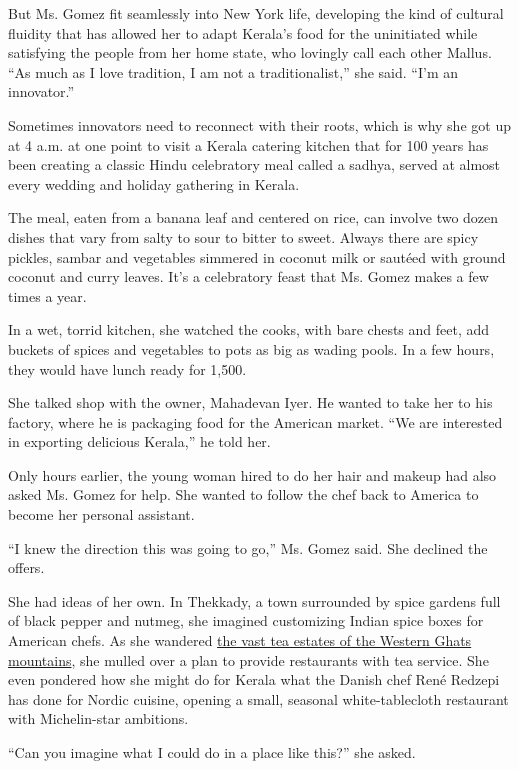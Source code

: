 But Ms. Gomez fit seamlessly into New York life, developing the kind of
cultural fluidity that has allowed her to adapt Kerala's food for the
uninitiated while satisfying the people from her home state, who
lovingly call each other Mallus. ``As much as I love tradition, I am not
a traditionalist,'' she said. ``I'm an innovator.''

Sometimes innovators need to reconnect with their roots, which is why
she got up at 4 a.m. at one point to visit a Kerala catering kitchen
that for 100 years has been creating a classic Hindu celebratory meal
called a sadhya, served at almost every wedding and holiday gathering in
Kerala.

The meal, eaten from a banana leaf and centered on rice, can involve two
dozen dishes that vary from salty to sour to bitter to sweet. Always
there are spicy pickles, sambar and vegetables simmered in coconut milk
or sautéed with ground coconut and curry leaves. It's a celebratory
feast that Ms. Gomez makes a few times a year.

In a wet, torrid kitchen, she watched the cooks, with bare chests and
feet, add buckets of spices and vegetables to pots as big as wading
pools. In a few hours, they would have lunch ready for 1,500.

She talked shop with the owner, Mahadevan Iyer. He wanted to take her to
his factory, where he is packaging food for the American market. ``We
are interested in exporting delicious Kerala,'' he told her.

Only hours earlier, the young woman hired to do her hair and makeup had
also asked Ms. Gomez for help. She wanted to follow the chef back to
America to become her personal assistant.

``I knew the direction this was going to go,'' Ms. Gomez said. She
declined the offers.

She had ideas of her own. In Thekkady, a town surrounded by spice
gardens full of black pepper and nutmeg, she imagined customizing Indian
spice boxes for American chefs. As she wandered
\href{http://www.conservationindia.org/gallery/wildlife-in-tea-plantations-western-ghats}{the
vast tea estates of the Western Ghats mountains}, she mulled over a plan
to provide restaurants with tea service. She even pondered how she might
do for Kerala what the Danish chef René Redzepi has done for Nordic
cuisine, opening a small, seasonal white-tablecloth restaurant with
Michelin-star ambitions.

``Can you imagine what I could do in a place like this?'' she asked.

